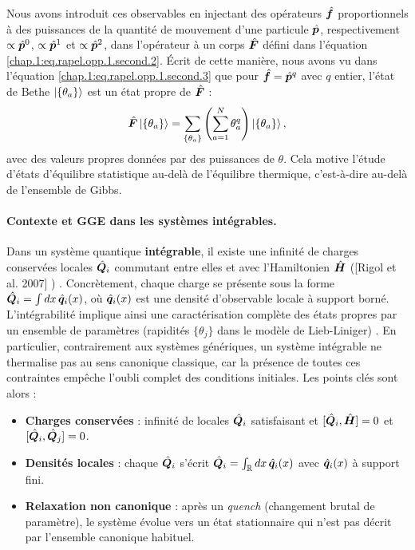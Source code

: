 Nous avons introduit ces observables en injectant des opérateurs $\hat{\bm{f}}$ proportionnels à des puissances de la quantité de mouvement d’une particule $\hat{\bm{p}}$, respectivement $\propto \hat{\bm{p}}^0$, $\propto \hat{\bm{p}}^1$ et $\propto \hat{\bm{p}}^2$, dans l’opérateur à un corps $\hat{\bm{F}}$ défini dans l’équation \eqref{chap.1:eq.rapel.opp.1.second.2}. Écrit de cette manière, nous avons vu dans l’équation \eqref{chap.1:eq.rapel.opp.1.second.3} que pour $\hat{\bm{f}} = \hat{\bm{p}}^q$ avec $q$ entier, l’état de Bethe $\ket{\{ \theta_a \} }$ est un état propre de $\hat{\bm{F}}$ :
\begin{eqnarray}\label{chap.2:eq.rapel.opp.1.second.1}
	 \hat{\bm{F}} \ket{\{\theta_a\}} =   \sum_{ \{\theta_a\} }\left( \sum_{a = 1}^N \theta_a^q \right) \ket{\{\theta_a\}},
\end{eqnarray}
avec des valeurs propres données par des puissances de $\theta$. Cela motive l’étude d’états d’équilibre statistique au-delà de l’équilibre thermique, c’est-à-dire au-delà de l’ensemble de Gibbs.
   




\paragraph{Contexte et GGE dans les systèmes intégrables.}

Dans un système quantique {\bf intégrable}, il existe une infinité de charges conservées locales $\hat{\bm{Q}}_i$ commutant entre elles et avec l’Hamiltonien $\hat{\bm{H}}$ ([Rigol et al. 2007] ) \cite{??}. Concrètement, chaque charge se présente sous la forme $\hat{\bm{Q}}_i = \int dx \,\hat{\bm{q}}_i(x)$, où $\hat{\bm{q}}_i(x)$ est une densité d’observable locale à support borné. L’intégrabilité implique ainsi une caractérisation complète des états propres par un ensemble de paramètres (rapidités $\{\theta_j\}$ dans le modèle de Lieb-Liniger) \cite{??}. En particulier, contrairement aux systèmes génériques, un système intégrable ne thermalise pas au sens canonique classique, car la présence de toutes ces contraintes empêche l’oubli complet des conditions initiales. Les points clés sont alors :

\begin{itemize}[label = $\bullet$]
	\item {\bf Charges conservées} : infinité de locales $\hat{\bm{Q}}_i$ satisfaisant et $[\hat{\bm{Q}}_i , \hat{\bm{H}} ] = 0$ et $[\hat{\bm{Q}}_i , \hat{\bm{Q}}_j ] = 0$.
	\item {\bf Densités locales} : chaque $\hat{\bm{Q}}_i$ s’écrit $\hat{\bm{Q}}_i = \int_\mathbb{R} dx \, \hat{\bm{q}}_i(x)$ avec $\hat{\bm{q}}_i(x)$ à support fini.
	\item {\bf Relaxation non canonique} : après un {\em quench} (changement brutal de paramètre), le système évolue vers un état stationnaire qui n’est pas décrit par l’ensemble canonique habituel.
\end{itemize}

